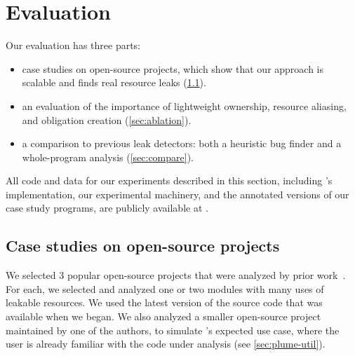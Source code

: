 \section{Evaluation}
\label{sec:evaluation}



Our evaluation has three parts:
\begin{itemize}
\item case studies on open-source projects, which show that our approach
  is scalable and finds real resource leaks (\cref{sec:case-studies}).
\item an evaluation of the importance of
  lightweight ownership, %
  resource aliasing, %
  and obligation creation %
  (\cref{sec:ablation}).
\item a comparison to previous leak detectors:  both a heuristic bug finder
  and a whole-program
  analysis (\cref{sec:compare}).
\end{itemize}


All code and data for our experiments described
in this section, including \tool's implementation, our experimental
machinery, and the annotated versions of our case study programs,
are publicly available at .

\subsection{Case studies on open-source projects}
\label{sec:case-studies}

We selected 3 popular open-source projects that were analyzed by prior work~\cite{zuo2019grapple}.
For each, we selected and analyzed one or two modules
with many uses of leakable resources. We used
the latest version of the source code that was available
when we began. We also analyzed a smaller open-source project
maintained by one of the authors, to simulate \tool's
expected use case, where the user is already familiar with the
code under analysis (see \cref{sec:plume-util}).

